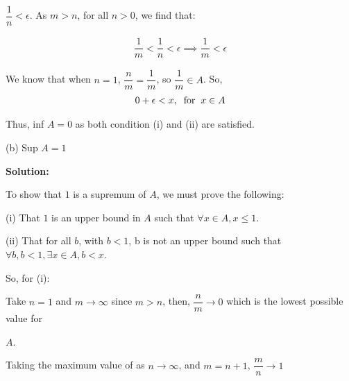 \documentclass{article}
\begin{document}
{\vspace{2mm}

$\dfrac{1}{n} < \epsilon$. As $m > n$, for all $n > 0$, we find that:

 \begin{align*}
\dfrac{1}{m} < \dfrac{1}{n} < \epsilon \implies \dfrac{1}{m} < \epsilon
\end{align*}

\vspace{2mm}

We know that when $n = 1$, $\dfrac{n}{m} = \dfrac{1}{m}$, so $\dfrac{1}{m} \in A$. So,
\begin{align*}
0 + \epsilon < x,\hspace{2mm} \text{for} \hspace{2mm} x \in A
\end{align*}

\vspace{2mm}

Thus, inf $A = 0$ as both condition (i) and (ii) are satisfied. 

\vspace{6mm} 

(b) Sup $A = 1$
\vspace{5mm}

\textbf{Solution:}

\vspace{5mm}

To show that $1$ is a supremum of $A$, we must prove the following:

\vspace{2mm}

(i) That $1$ is an upper bound in $A$ such that $\forall x \in A, x \leqslant 1$.

\vspace{2mm}

(ii) That for all $b$, with $b < 1$, b is not an upper bound such that $\forall b, b < 1, \exists x \in A, b < x$.

\vspace{2mm}

So, for (i):

\vspace{2mm}

Take $n = 1$ and $m \rightarrow \infty$ since $m > n$, then, $\dfrac{n}{m} \rightarrow 0$ which is the lowest possible value for 

$A$.

\vspace{2mm}

Taking the maximum value of as $n \rightarrow \infty$, and $m = n+1$, $\dfrac{m}{n} \rightarrow 1$

}
\end{document}
